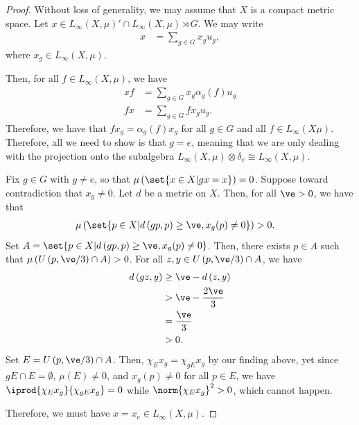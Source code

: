 \documentclass[10pt]{mypackage}
\begin{document}
\begin{proof}
  Without loss of generality, we may assume that $X$ is a compact metric space. Let $x\in L_{\infty}\left( X,\mu \right)'\cap L_{\infty}\left( X,\mu \right)\rtimes G$. We may write
  \begin{align*}
    x &= \sum_{g\in G} x_gu_g,
  \end{align*}
  where $x_g\in L_{\infty}\left( X,\mu \right)$.

  Then, for all $f\in L_{\infty}\left( X,\mu \right)$, we have
  \begin{align*}
    xf &= \sum_{g\in G} x_g \alpha_g(f)u_g\\
    fx &= \sum_{g\in G}fx_gu_g.
  \end{align*}
  Therefore, we have that $fx_g = \alpha_g (f)x_g$ for all $g\in G$ and all $f\in L_{\infty}\left( X\mu \right)$. Therefore, all we need to show is that $g = e$, meaning that we are only dealing with the projection onto the subalgebra $L_{\infty}\left( X,\mu \right)\otimes \delta_e \cong L_{\infty}\left( X,\mu \right)$.

  Fix $g\in G$ with $g\neq e$, so that $\mu\left( \set{x\in X | gx = x} \right) = 0$. Suppose toward contradiction that $x_g \neq 0$. Let $d$ be a metric on $X$. Then, for all $\ve > 0$, we have that 
  \begin{align*}
    \mu\left( \set{p\in X | d\left( gp,p \right) \geq \ve,x_g(p)\neq 0} \right) &> 0.
  \end{align*}
  Set $A = \set{p\in X | d\left( gp,p \right)\geq \ve,x_g(p)\neq 0}$. Then, there exists $p\in A$ such that $\mu\left( U\left( p,\ve/3 \right)\cap A  \right)> 0$. For all $z,y\in U\left( p,\ve/3 \right)\cap A$, we have
  \begin{align*}
    d\left( gz,y \right) &\geq \ve - d\left( z,y \right)\\
                         &> \ve - \frac{2\ve}{3}\\
                         &= \frac{\ve}{3}\\
                         &> 0.
  \end{align*}
  Set $E = U\left( p,\ve/3 \right)\cap A$. Then, $\chi_Ex_g = \chi_{gE}x_g$ by our finding above, yet since $gE\cap E = \emptyset$, $\mu(E)\neq 0$, and $x_g(p)\neq 0$ for all $p\in E$, we have $ \iprod{\chi_Ex_g}{\chi_{gE}x_g} = 0 $ while $\norm{\chi_Ex_g}^2 > 0$, which cannot happen.

  Therefore, we must have $x = x_e\in L_{\infty}\left( X,\mu \right)$.
\end{proof}
\end{document}
